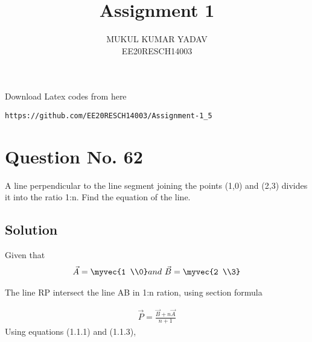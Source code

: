 \documentclass[journal,12pt,twocolumn]{IEEEtran}
\begin{document}
     \def\rightbox#1{\makebox[0in][r]{#1}}
     \def\centbox#1{\makebox[0in]{#1}}
     \def\topbox#1{\raisebox{-\baselineskip}[0in][0in]{#1}}
     \def\midbox#1{\raisebox{-0.5\baselineskip}[0in][0in]{#1}}
\vspace{3cm}
\title{Assignment 1}
\author{MUKUL KUMAR YADAV\\ EE20RESCH14003}
\maketitle
\newpage
\bigskip
\renewcommand{\thefigure}{\theenumi}
\renewcommand{\thetable}{\theenumi}
 Download Latex codes from here
\begin{lstlisting}
https://github.com/EE20RESCH14003/Assignment-1_5
\end{lstlisting}
%

%

%
\section{\textbf{Question No. 62}}
A line perpendicular to the line segment joining the points (1,0) and (2,3) divides it into the ratio 1:n. Find the equation of the line.

\subsection{\textbf{Solution}}

\begin{center}
    
\end{center} 
Given that
\begin{align}
\vec{A}=\myvec{1 \\0}   and \ \vec{B}= \myvec{2 \\3}
\end{align}

The line RP intersect the line AB in 1:n ration, using section formula


\begin{align}
\vec{P}=\frac{\vec{B}+n\vec{A}}{n+1}  
\end{align}
Using equations (1.1.1) and (1.1.3), 
\end{document}
